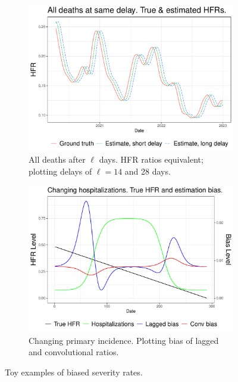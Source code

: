 \documentclass{article}
\begin{document}
\begin{figure}[tb]
\centering
\begin{subfigure}[b]{0.495\linewidth}
  \centering
         \includegraphics[width=\linewidth]{Figures/Simulated/sim_onehot.pdf} 
         \caption{All deaths after $\ell$ days. HFR ratios equivalent;
         plotting delays of $\ell=14$ and 28 days.} 
         \label{fig:onehot}
     \end{subfigure}
     \hfill
     \begin{subfigure}[b]{0.495\linewidth}
         \centering
         \includegraphics[width=\linewidth]{Figures/Simulated/sim_chging_primary.pdf} 
         \caption{Changing primary incidence. Plotting bias of lagged and
         convolutional ratios.} 
         \label{fig:chging_primary}
     \end{subfigure}
        \caption{Toy examples of biased severity rates.} 
        \label{fig:bias_ex}
\end{figure}
\end{document}

